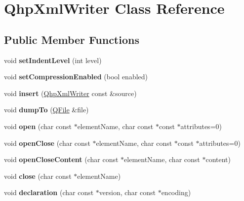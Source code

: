 \hypertarget{class_qhp_xml_writer}{}\section{Qhp\+Xml\+Writer Class Reference}
\label{class_qhp_xml_writer}
\subsection*{Public Member Functions}
\begin{DoxyCompactItemize}
\item 
\mbox{\label{class_qhp_xml_writer_a123d00e83e99a92ed17197bd5af02e22}} 
void {\bfseries set\+Indent\+Level} (int level)
\item 
\mbox{\label{class_qhp_xml_writer_abcb9a02176e91e793f539f349f6f6f87}} 
void {\bfseries set\+Compression\+Enabled} (bool enabled)
\item 
\mbox{\label{class_qhp_xml_writer_ad6c47073ba62731ec5717abc48189c6e}} 
void {\bfseries insert} (\mbox{\hyperlink{class_qhp_xml_writer}{Qhp\+Xml\+Writer}} const \&source)
\item 
\mbox{\label{class_qhp_xml_writer_a4774f32eef656819475f1d68778c356b}} 
void {\bfseries dump\+To} (\mbox{\hyperlink{class_q_file}{Q\+File}} \&file)
\item 
\mbox{\label{class_qhp_xml_writer_a1aebd4452891a3e71899b13ed7e21bcb}} 
void {\bfseries open} (char const $\ast$element\+Name, char const $\ast$const $\ast$attributes=0)
\item 
\mbox{\label{class_qhp_xml_writer_a879cff85acf2a0fdc058a7e3c6161008}} 
void {\bfseries open\+Close} (char const $\ast$element\+Name, char const $\ast$const $\ast$attributes=0)
\item 
\mbox{\label{class_qhp_xml_writer_adbab0f4cde60e8f37061081078fa7be2}} 
void {\bfseries open\+Close\+Content} (char const $\ast$element\+Name, char const $\ast$content)
\item 
\mbox{\label{class_qhp_xml_writer_ad714a9eacec5e599c05d4d2f042536e5}} 
void {\bfseries close} (char const $\ast$element\+Name)
\item 
\mbox{\label{class_qhp_xml_writer_a0be9988f8d6e3873f21e14c9fe53c024}} 
void {\bfseries declaration} (char const $\ast$version, char const $\ast$encoding)
\end{DoxyCompactItemize}
